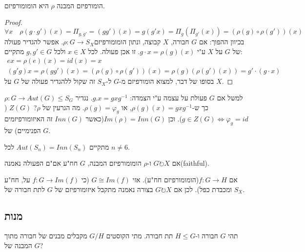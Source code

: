 \documentclass{tstextbook}
\begin{document}
\begin{proposition}
הומורפיזם המבנה \(\rho\) היא הומומורפיזם.

\end{proposition}
\begin{proof}
$$\forall x\quad  \rho\left( g\cdot g' \right)(x)=\Pi_{g,g'}=(gg')(x)=g(g'x)=\Pi_{g}\left( \Pi_{g'}(x) \right)=\left( \rho(g) \circ  \rho(g') \right)(x)$$
בכיוון ההפוך: אם \(G\) חבורה, \(X\) קבוצה, ונתון הומומורפיזם\(\rho:G\to S_{X}\). אפשר להגדיר פעולה של \(G\) על \(X\) ע"י \(g\cdot x=\rho(g)(x)\). זו אכן פעולה. לכל \(x \in X\) ולכל \(g,g'\in G\) מתקיים: 
$$\begin{gathered}e x=\rho(e)(x)=id(x)=x \\(g'g)x= \rho(gg')(x)=\left( \rho(g)\circ \rho(g') \right)(x)=\rho(g)\left( \rho(g')(x) \right)=g'\cdot \left( g\cdot x \right)
\end{gathered}$$ בסופו של דבר, למצוא הומורפיזם מ-\(G\) ל-\(S_{X}\) זה שקול ללהגדיר פעולה של \(G\) על \(X\).

\end{proof}
\begin{example}
למשל אם \(G\) פעולת על עצמה ע"י הצמדה: \(g.x=gxg^{-1}\). נגדיר \(\rho:G\to Aut(G)\leq S_{G}\) כך ש-\(\rho(g)(x)=gxg^{-1}\), או \(\rho(g)=\varphi_{g}\). מה הגרעין של \(\rho\)? \(Z(G)\) (\(g\in Z(G)\iff \varphi_{g}=id\)).
וכן \(Im\left( \rho \right)=Inn(G)\)(כאשר \(Inn(G)\) זה האיזומורפיזמים הפנימיים) של \(G\).

\end{example}
\begin{remark}
מתקיים \(Aut(S_{n})=Inn(S_{n})\) לכל \(n\neq 6\).

\end{remark}
\begin{remark}
אם \(G\circlearrowright X\) ו-\(\rho\) הומומורפיזם המבנה, \(G\) חח"ע אם"ם הפעולה נאמנה(faithful).

\end{remark}
\begin{remark}
אם \(f:G\to H\)(הומומורפיזם חח"ע). אזי \(G\cong Im(f)\) (כי \(f:G\to Im(f)\) על, חח"ע ומכבדת כפל). לכן אם \(G\circlearrowright X\) בצורה נאמנה מתקבל איזומורפיזם של \(G\) לתת חבורה של \(S_{X}\).

\end{remark}
\subsection{מנות}

תהי \(G\) חבורה ו-\(H\leq G\) תת חבורה. מתי הקוסטים \(G/H\) מקבלים מבנים של חבורה מתוך המבנה של \(G\)?
\end{document}
